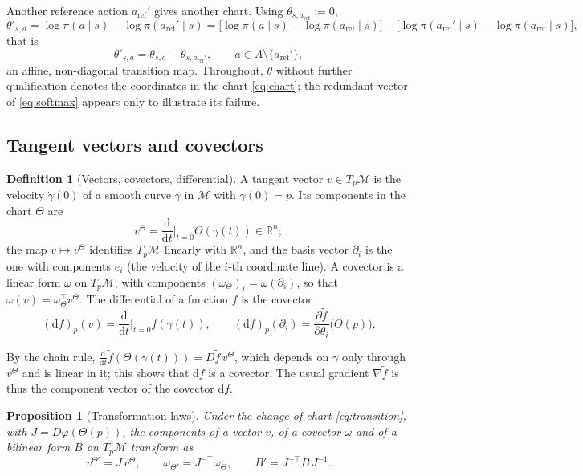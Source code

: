 \documentclass[11pt,a4paper]{article}
\numberwithin{equation}{section}
\theoremstyle{plain}
\newtheorem{proposition}[theorem]{Proposition}
\theoremstyle{definition}
\newtheorem{definition}[theorem]{Definition}
\theoremstyle{remark}
\newcommand{\R}{\mathbb{R}}
\newcommand{\T}{^{\top}}
\newcommand{\dd}{\mathrm{d}}
\newcommand{\aref}{a_{\mathrm{ref}}}
\newcommand{\mani}{\mathcal{M}}
\begin{document}
Another reference action $\aref'$ gives another chart. Using $\theta_{s,\aref}:=0$,
\[
  \theta'_{s,a}=\log\pi(a\mid s)-\log\pi(\aref'\mid s)
  =\bigl[\log\pi(a\mid s)-\log\pi(\aref\mid s)\bigr]-\bigl[\log\pi(\aref'\mid s)-\log\pi(\aref\mid s)\bigr],
\]
that is
\begin{equation}\label{eq:change-ref}
  \theta'_{s,a}=\theta_{s,a}-\theta_{s,\aref'},\qquad a\in A\setminus\{\aref'\},
\end{equation}
an affine, non-diagonal transition map. Throughout, $\theta$ without further qualification denotes the coordinates in
the chart \eqref{eq:chart}; the redundant vector of \eqref{eq:softmax} appears only to illustrate its failure.

\subsection{Tangent vectors and covectors}

\begin{definition}[Vectors, covectors, differential]\label{def:tangent}
A tangent vector $v\in T_p\mani$ is the velocity $\dot\gamma(0)$ of a smooth curve $\gamma$ in $\mani$ with $\gamma(0)=p$.
Its components in the chart $\Theta$ are
\[
  v^{\Theta}=\frac{\dd}{\dd t}\Big|_{t=0}\Theta(\gamma(t))\in\R^n ;
\]
the map $v\mapsto v^\Theta$ identifies $T_p\mani$ linearly with $\R^n$, and the basis vector $\partial_i$ is the one with
components $e_i$ (the velocity of the $i$-th coordinate line). A covector is a linear form $\omega$ on $T_p\mani$, with
components $(\omega_\Theta)_i=\omega(\partial_i)$, so that $\omega(v)=\omega_\Theta\T v^\Theta$. The differential of a function
$f$ is the covector
\[
  (\dd f)_p(v)=\frac{\dd}{\dd t}\Big|_{t=0}f(\gamma(t)),
  \qquad
  (\dd f)_p(\partial_i)=\frac{\partial\tilde f}{\partial\theta_i}\bigl(\Theta(p)\bigr).
\]
\end{definition}

By the chain rule, $\frac{\dd}{\dd t}\tilde f(\Theta(\gamma(t)))=D\tilde f\,v^\Theta$, which depends on $\gamma$ only through $v^\Theta$ and is linear
in it; this shows that $\dd f$ is a covector. The usual gradient $\nabla\tilde f$ is thus the component vector of the covector $\dd f$.

\begin{proposition}[Transformation laws]\label{prop:transformation}
Under the change of chart \eqref{eq:transition}, with $J=D\varphi(\Theta(p))$, the components of a vector $v$, of a covector $\omega$ and of a
bilinear form $B$ on $T_p\mani$ transform as
\begin{equation}\label{eq:transformation}
  v^{\Theta'}=J\,v^\Theta,\qquad
  \omega_{\Theta'}=J^{-\top}\omega_\Theta,\qquad
  B'=J^{-\top}B\,J^{-1}.
\end{equation}
\end{proposition}
\end{document}
